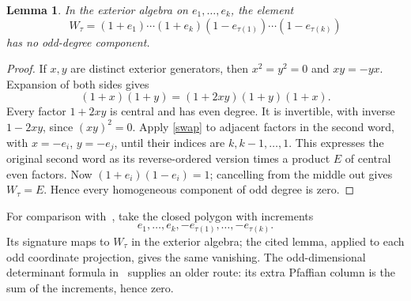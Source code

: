 \documentclass[11pt]{article}
\newtheorem{lemma}[theorem]{Lemma}
\begin{document}
\begin{lemma}\label{balanced}
In the exterior algebra on $e_1,\ldots,e_k$, the element
\[
W_\tau=(1+e_1)\cdots(1+e_k)
(1-e_{\tau(1)})\cdots(1-e_{\tau(k)})
\]
has no odd-degree component.
\end{lemma}
\begin{proof}
If $x,y$ are distinct exterior generators, then $x^2=y^2=0$ and $xy=-yx$.
Expansion of both sides gives
\begin{equation}\label{swap}
(1+x)(1+y)=(1+2xy)(1+y)(1+x).
\end{equation}
Every factor $1+2xy$ is central and has even degree. It is invertible,
with inverse $1-2xy$, since $(xy)^2=0$. Apply \eqref{swap} to adjacent
factors in the second word, with $x=-e_i$, $y=-e_j$, until their indices
are $k,k-1,\ldots,1$. This expresses the original second word as its
reverse-ordered version times a product $E$ of central even factors.
Now $(1+e_i)(1-e_i)=1$; cancelling from the middle out gives $W_\tau=E$.
Hence every homogeneous component of odd degree is zero.
\end{proof}

For comparison with~\cite[Lemma 22]{DR}, take the closed polygon with increments
\[
e_1,\ldots,e_k,-e_{\tau(1)},\ldots,-e_{\tau(k)}.
\]
Its signature maps to $W_\tau$ in the exterior algebra; the cited lemma,
applied to each odd coordinate projection, gives the same vanishing.
The odd-dimensional determinant formula in~\cite[pp.~138--139,
Eqs.~(4.3)--(4.5)]{deBruijn} supplies an older route: its extra
Pfaffian column is the sum of the increments, hence zero.
\end{document}
